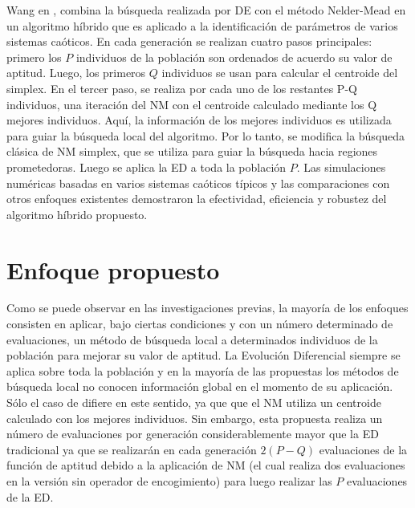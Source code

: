Wang en \cite{wang2011parameter}, combina la búsqueda realizada por DE con el método Nelder-Mead  en un algoritmo híbrido que es aplicado a la identificación de parámetros de varios sistemas caóticos. En cada generación se realizan cuatro pasos principales: primero los $P$ individuos de la población son ordenados de acuerdo su valor de aptitud. Luego, los primeros $Q$ individuos se usan para calcular el centroide del simplex. En el tercer paso, se realiza por cada uno de los restantes P-Q individuos, una iteración del NM con el centroide calculado mediante los Q mejores individuos. Aquí, la información de los mejores individuos es utilizada para guiar la búsqueda local del algoritmo. Por lo tanto, se modifica la búsqueda clásica de NM simplex, que se utiliza para guiar la búsqueda hacia regiones prometedoras. Luego se aplica la ED a toda la población $P$. Las simulaciones numéricas basadas en varios sistemas caóticos típicos y las comparaciones con otros enfoques existentes demostraron la efectividad, eficiencia y robustez del algoritmo híbrido propuesto. 



\section{Enfoque propuesto}\label{sec:Enfoque propuesto}
Como se puede observar en las investigaciones previas, la mayoría de los enfoques consisten en aplicar, bajo ciertas condiciones y con un número determinado de evaluaciones,  un método de búsqueda local a determinados individuos de la población para mejorar su valor de aptitud. La Evolución Diferencial siempre se aplica sobre toda la población y en la mayoría de las propuestas los métodos de búsqueda local no conocen información global en el momento de su aplicación. Sólo el caso de \cite{wang2011parameter} difiere en este sentido, ya que que el NM utiliza un centroide calculado con los mejores individuos. Sin embargo, esta propuesta realiza un número de evaluaciones por generación considerablemente mayor que la ED tradicional ya que se realizarán en cada generación $2(P-Q)$ evaluaciones de la función de aptitud debido a la aplicación de NM (el cual realiza dos evaluaciones en la versión sin operador de encogimiento) para luego realizar las $P$ evaluaciones de la ED. 

